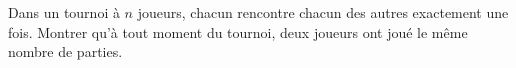 Dans un tournoi à $n$ joueurs, chacun rencontre chacun des autres exactement une fois. Montrer qu'à tout moment du tournoi, deux joueurs ont joué le même nombre de parties.
